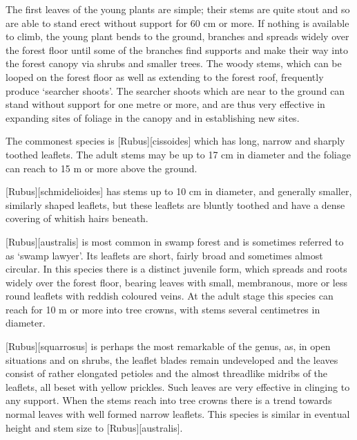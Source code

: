 The first leaves of the young plants are simple; their stems are quite stout and so are able to stand erect without support for 60 cm or more.
If nothing is available to climb, the young plant bends to the ground, branches and spreads widely over the forest floor until some of the branches find supports and make their way into the forest canopy via shrubs and smaller trees.
The woody stems, which can be looped on the forest floor as well as extending to the forest roof, frequently produce `searcher shoots'.
The searcher shoots which are near to the ground can stand without support for one metre or more, and are thus very effective in expanding sites of  foliage in the canopy and in establishing new sites.

The commonest species is [Rubus][cissoides] which has long, narrow and sharply toothed leaflets.
The adult stems may be up to 17 cm in diameter and the foliage can reach to 15 m or more above the ground.

[Rubus][schmidelioides] has stems up to 10 cm in diameter, and generally smaller, similarly shaped leaflets, but these leaflets are bluntly toothed and have a dense covering of whitish hairs beneath.

[Rubus][australis] is most common in swamp forest and is sometimes referred to as `swamp lawyer'.
Its leaflets are short, fairly broad and sometimes almost circular.
In this species there is a distinct juvenile form, which spreads and roots widely over the forest floor, bearing leaves with small, membranous, more or less round leaflets with reddish coloured veins.
At the adult stage this species can reach for 10 m or more into tree crowns, with stems several centimetres in diameter.

[Rubus][squarrosus] is perhaps the most remarkable of the genus, as, in open situations and on shrubs, the leaflet blades remain undeveloped and the leaves consist of rather elongated petioles and the almost threadlike midribs of the leaflets, all beset with yellow prickles.
Such leaves are very effective in clinging to any support.
When the stems reach into tree crowns there is a trend towards normal leaves with well formed narrow leaflets.
This species is similar in eventual height and stem size to [Rubus][australis].


